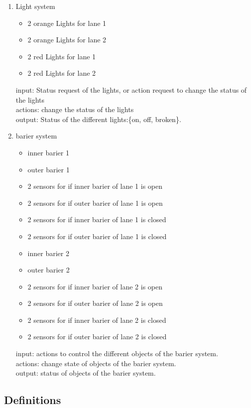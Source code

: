 \documentclass[a4paper]{article}
\begin{document}
\begin{enumerate}
\item{Light system}
\begin{itemize}
\item{2 orange Lights for lane 1}
\item{2 orange Lights for lane 2}
\item{2 red Lights for lane 1}
\item{2 red Lights for lane 2}
\end{itemize}
input: Status request of the lights, or action request to change the status of the lights \\
actions: change the status of the lights\\
output: Status of the different lights:\{on, off, broken\}.
 

\item{barier system}
\begin{itemize}
\item{inner barier 1}
\item{outer barier 1}
\item{2 sensors for if inner barier of lane 1 is open}
\item{2 sensors for if outer barier of lane 1 is open}
\item{2 sensors for if inner barier of lane 1 is closed}
\item{2 sensors for if outer barier of lane 1 is closed}
\item{inner barier 2}
\item{outer barier 2}
\item{2 sensors for if inner barier of lane 2 is open}
\item{2 sensors for if outer barier of lane 2 is open}
\item{2 sensors for if inner barier of lane 2 is closed}
\item{2 sensors for if outer barier of lane 2 is closed}
\end{itemize}
input: actions to control the different objects of the barier system. \\
actions: change state of objects of the barier system. \\
output: status of objects of the barier system. 


\end{enumerate}

\subsection{Definitions}
\label{sec:definitions}
\end{document}
